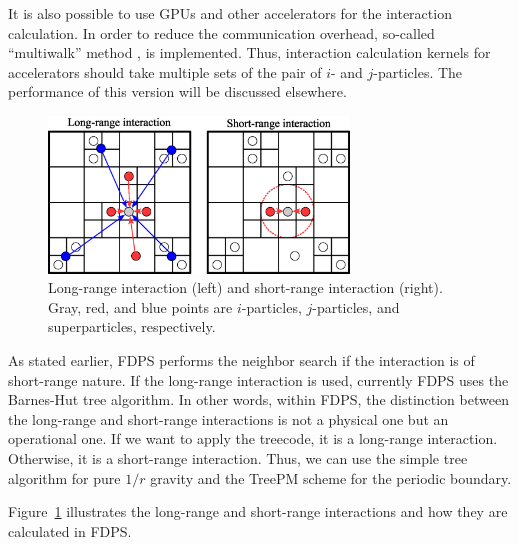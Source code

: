It is also possible to use GPUs and other accelerators for the
interaction calculation. In order to reduce the communication
overhead, so-called ``multiwalk'' method \citet{hamada2009novel}, is
implemented. Thus, interaction calculation kernels for accelerators
should take multiple sets of the pair of $i$- and $j$-particles. The
performance of this version will be discussed elsewhere.

\begin{figure}
  \begin{center}
    \includegraphics[width=8cm]{figure/force_type.eps}
  \end{center}
  \caption{Long-range interaction (left) and short-range interaction
    (right). Gray, red, and blue points are $i$-particles,
    $j$-particles, and superparticles, respectively.}
  \label{fig:forcetype}
\end{figure}

As stated earlier, FDPS performs the neighbor search if the interaction
is of short-range nature. If the long-range interaction is used,
currently FDPS uses the Barnes-Hut tree algorithm. In other words,
within FDPS, the distinction between the long-range and short-range
interactions is not a physical one but an operational one. If we want
to apply the treecode, it is a long-range interaction. Otherwise, it is
a short-range interaction.  Thus, we can use the simple tree
algorithm for pure $1/r$ gravity and the TreePM scheme
\citep{1995ApJS...98..355X, 2000ApJS..128..561B, 2002JApA...23..185B,
  2004NewA....9..111D, 2005MNRAS.364.1105S, 2005PASJ...57..849Y,
  2009PASJ...61.1319I, Ishiyama:2012:PAN:2388996.2389003} for the
periodic boundary.


Figure~\ref{fig:forcetype} illustrates the long-range and short-range
interactions and how they are calculated in FDPS.

